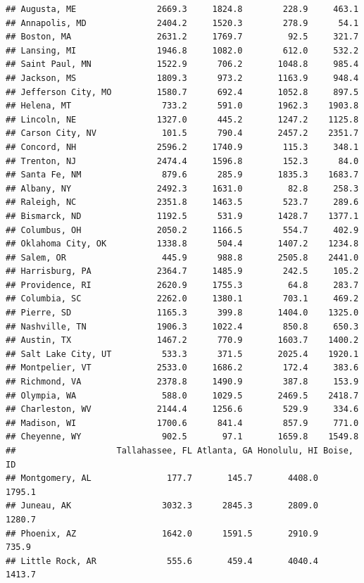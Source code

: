 \documentclass[
]{article}
\begin{document}
\begin{verbatim}
## Augusta, ME                2669.3     1824.8        228.9     463.1
## Annapolis, MD              2404.2     1520.3        278.9      54.1
## Boston, MA                 2631.2     1769.7         92.5     321.7
## Lansing, MI                1946.8     1082.0        612.0     532.2
## Saint Paul, MN             1522.9      706.2       1048.8     985.4
## Jackson, MS                1809.3      973.2       1163.9     948.4
## Jefferson City, MO         1580.7      692.4       1052.8     897.5
## Helena, MT                  733.2      591.0       1962.3    1903.8
## Lincoln, NE                1327.0      445.2       1247.2    1125.8
## Carson City, NV             101.5      790.4       2457.2    2351.7
## Concord, NH                2596.2     1740.9        115.3     348.1
## Trenton, NJ                2474.4     1596.8        152.3      84.0
## Santa Fe, NM                879.6      285.9       1835.3    1683.7
## Albany, NY                 2492.3     1631.0         82.8     258.3
## Raleigh, NC                2351.8     1463.5        523.7     289.6
## Bismarck, ND               1192.5      531.9       1428.7    1377.1
## Columbus, OH               2050.2     1166.5        554.7     402.9
## Oklahoma City, OK          1338.8      504.4       1407.2    1234.8
## Salem, OR                   445.9      988.8       2505.8    2441.0
## Harrisburg, PA             2364.7     1485.9        242.5     105.2
## Providence, RI             2620.9     1755.3         64.8     283.7
## Columbia, SC               2262.0     1380.1        703.1     469.2
## Pierre, SD                 1165.3      399.8       1404.0    1325.0
## Nashville, TN              1906.3     1022.4        850.8     650.3
## Austin, TX                 1467.2      770.9       1603.7    1400.2
## Salt Lake City, UT          533.3      371.5       2025.4    1920.1
## Montpelier, VT             2533.0     1686.2        172.4     383.6
## Richmond, VA               2378.8     1490.9        387.8     153.9
## Olympia, WA                 588.0     1029.5       2469.5    2418.7
## Charleston, WV             2144.4     1256.6        529.9     334.6
## Madison, WI                1700.6      841.4        857.9     771.0
## Cheyenne, WY                902.5       97.1       1659.8    1549.8
##                    Tallahassee, FL Atlanta, GA Honolulu, HI Boise, ID
## Montgomery, AL               177.7       145.7       4408.0    1795.1
## Juneau, AK                  3032.3      2845.3       2809.0    1280.7
## Phoenix, AZ                 1642.0      1591.5       2910.9     735.9
## Little Rock, AR              555.6       459.4       4040.4    1413.7

\end{verbatim}
\end{document}
